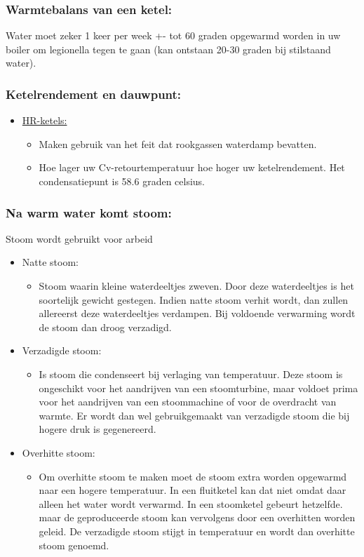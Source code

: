 \documentclass[12pt]{article}
\begin{document}
\subsubsection{Warmtebalans van een ketel:}

Water moet zeker 1 keer per week +- tot 60 graden opgewarmd worden in uw boiler om legionella tegen te gaan (kan ontstaan 20-30 graden bij stilstaand water).
\subsubsection{Ketelrendement en dauwpunt:}
\begin{itemize}
    \item \underline{HR-ketels:}\begin{itemize}
        \item Maken gebruik van het feit dat rookgassen waterdamp bevatten.
        \item Hoe lager uw Cv-retourtemperatuur hoe hoger uw ketelrendement. Het condensatiepunt is 58.6 graden celsius.
    \end{itemize}
\end{itemize}
\subsubsection{Na warm water komt stoom:}
Stoom wordt gebruikt voor arbeid
\begin{itemize}
    \item Natte stoom:\begin{itemize}
        \item Stoom waarin kleine waterdeeltjes zweven. Door deze waterdeeltjes is het soortelijk gewicht gestegen. Indien natte stoom verhit wordt, dan zullen allereerst deze waterdeeltjes verdampen. Bij voldoende verwarming wordt de stoom dan droog verzadigd.
    \end{itemize}
    \item Verzadigde stoom:\begin{itemize}
        \item Is stoom die condenseert bij verlaging van temperatuur. Deze stoom is ongeschikt voor het aandrijven van een stoomturbine, maar voldoet prima voor het aandrijven van een stoommachine of voor de overdracht van warmte. Er wordt dan wel gebruikgemaakt van verzadigde stoom die bij hogere druk is gegenereerd.
    \end{itemize}
    \item Overhitte stoom:\begin{itemize}
        \item Om overhitte stoom te maken moet de stoom extra worden opgewarmd naar een hogere temperatuur. In een fluitketel kan dat niet omdat daar alleen het water wordt verwarmd. In een stoomketel gebeurt hetzelfde. maar de geproduceerde stoom kan vervolgens door een overhitten worden geleid. De verzadigde stoom stijgt in temperatuur en wordt dan overhitte stoom genoemd.
    \end{itemize}
\end{itemize}
\end{document}
